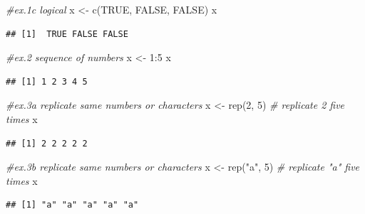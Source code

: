 \documentclass[
]{book}
\newenvironment{Shaded}{\begin{snugshade}}{\end{snugshade}}
\newcommand{\CommentTok}[1]{\textcolor[rgb]{0.56,0.35,0.01}{\textit{#1}}}
\newcommand{\ConstantTok}[1]{\textcolor[rgb]{0.00,0.00,0.00}{#1}}
\newcommand{\DecValTok}[1]{\textcolor[rgb]{0.00,0.00,0.81}{#1}}
\newcommand{\FunctionTok}[1]{\textcolor[rgb]{0.00,0.00,0.00}{#1}}
\newcommand{\NormalTok}[1]{#1}
\newcommand{\OtherTok}[1]{\textcolor[rgb]{0.56,0.35,0.01}{#1}}
\newcommand{\SpecialCharTok}[1]{\textcolor[rgb]{0.00,0.00,0.00}{#1}}
\newcommand{\StringTok}[1]{\textcolor[rgb]{0.31,0.60,0.02}{#1}}
\begin{document}
\begin{Shaded}
\begin{Highlighting}[]
\CommentTok{\#ex.1c logical}
\NormalTok{x }\OtherTok{\textless{}{-}} \FunctionTok{c}\NormalTok{(}\ConstantTok{TRUE}\NormalTok{, }\ConstantTok{FALSE}\NormalTok{, }\ConstantTok{FALSE}\NormalTok{)}
\NormalTok{x}
\end{Highlighting}
\end{Shaded}

\begin{verbatim}
## [1]  TRUE FALSE FALSE
\end{verbatim}

\begin{Shaded}
\begin{Highlighting}[]
\CommentTok{\#ex.2 sequence of numbers}
\NormalTok{x }\OtherTok{\textless{}{-}} \DecValTok{1}\SpecialCharTok{:}\DecValTok{5}
\NormalTok{x}
\end{Highlighting}
\end{Shaded}

\begin{verbatim}
## [1] 1 2 3 4 5
\end{verbatim}

\begin{Shaded}
\begin{Highlighting}[]
\CommentTok{\#ex.3a replicate same numbers or characters}
\NormalTok{x }\OtherTok{\textless{}{-}} \FunctionTok{rep}\NormalTok{(}\DecValTok{2}\NormalTok{, }\DecValTok{5}\NormalTok{) }\CommentTok{\# replicate 2 five times}
\NormalTok{x}
\end{Highlighting}
\end{Shaded}

\begin{verbatim}
## [1] 2 2 2 2 2
\end{verbatim}

\begin{Shaded}
\begin{Highlighting}[]
\CommentTok{\#ex.3b replicate same numbers or characters}
\NormalTok{x }\OtherTok{\textless{}{-}} \FunctionTok{rep}\NormalTok{(}\StringTok{"a"}\NormalTok{, }\DecValTok{5}\NormalTok{) }\CommentTok{\# replicate "a" five times}
\NormalTok{x}
\end{Highlighting}
\end{Shaded}

\begin{verbatim}
## [1] "a" "a" "a" "a" "a"
\end{verbatim}
\end{document}
